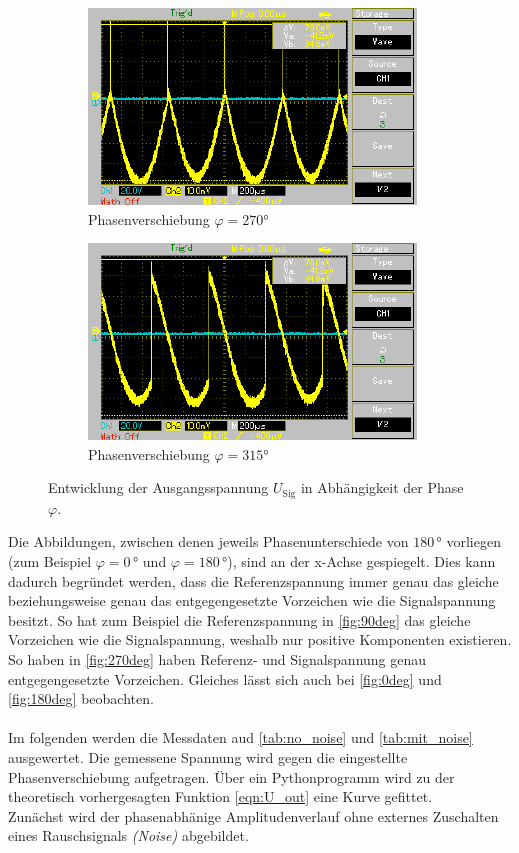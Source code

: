 \begin{figure}
\begin{subfigure}{0.48\textwidth}
        \includegraphics{Oszilloskop_270.pdf}
        \caption{Phasenverschiebung $\varphi = 270°$}
        \label{fig:270deg}
    \end{subfigure}
    \hfill
    \begin{subfigure}{0.48\textwidth}
        \centering
        \includegraphics{Oszilloskop_315.pdf}
        \caption{Phasenverschiebung $\varphi = 315°$}
        \label{fig:315deg}
    \end{subfigure}    
\caption{Entwicklung der Ausgangsspannung $U_\text{Sig}$ in Abhängigkeit der Phase $\varphi$.}
\end{figure}

\noindent
Die Abbildungen, zwischen denen jeweils Phasenunterschiede von $180\,\unit{\degree}$ vorliegen (zum Beispiel $\varphi = 0\,\unit{\degree}$ und $\varphi = 180\,\unit{\degree}$), 
sind an der x-Achse gespiegelt. Dies kann dadurch begründet werden, dass die
Referenzspannung immer genau das gleiche beziehungsweise genau das entgegengesetzte Vorzeichen wie die 
Signalspannung besitzt. So hat zum Beispiel die Referenzspannung in \autoref{fig:90deg} das gleiche Vorzeichen wie die 
Signalspannung, weshalb nur positive Komponenten existieren. So haben in \autoref{fig:270deg} haben Referenz- und 
Signalspannung genau entgegengesetzte Vorzeichen.
Gleiches lässt sich auch bei \autoref{fig:0deg} und \autoref{fig:180deg} beobachten.\\\\
\noindent
Im folgenden werden die Messdaten aud \autoref{tab:no_noise} und \autoref{tab:mit_noise} ausgewertet. Die gemessene 
Spannung wird gegen die eingestellte Phasenverschiebung aufgetragen. Über ein Pythonprogramm wird zu der 
theoretisch vorhergesagten Funktion \eqref{eqn:U_out} eine Kurve gefittet.\\
Zunächst wird der phasenabhänige Amplitudenverlauf ohne externes Zuschalten eines Rauschsignals \emph{(Noise)} abgebildet.

